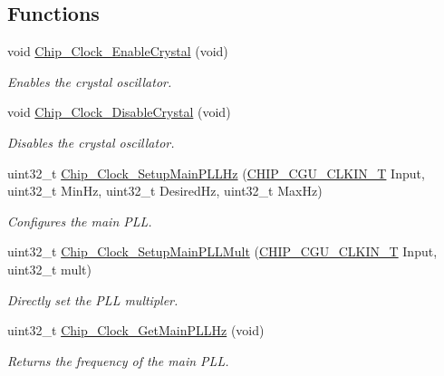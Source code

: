 \subsection*{Functions}
\begin{DoxyCompactItemize}
\item 
void \hyperlink{group___c_l_o_c_k__18_x_x__43_x_x_gaa74040cd24046b7e09cbb2c1cf6e6c0d}{Chip\+\_\+\+Clock\+\_\+\+Enable\+Crystal} (void)
\begin{DoxyCompactList}\small\item\em Enables the crystal oscillator. \end{DoxyCompactList}\item 
void \hyperlink{group___c_l_o_c_k__18_x_x__43_x_x_gadbc79ec252fc8518b284aff51e86adf5}{Chip\+\_\+\+Clock\+\_\+\+Disable\+Crystal} (void)
\begin{DoxyCompactList}\small\item\em Disables the crystal oscillator. \end{DoxyCompactList}\item 
uint32\+\_\+t \hyperlink{group___c_l_o_c_k__18_x_x__43_x_x_ga1667168db76064ac1c2bebd3dfa6db6d}{Chip\+\_\+\+Clock\+\_\+\+Setup\+Main\+P\+L\+L\+Hz} (\hyperlink{group___c_l_o_c_k__18_x_x__43_x_x_ga0975326707efebf2b074283e6c602f18}{C\+H\+I\+P\+\_\+\+C\+G\+U\+\_\+\+C\+L\+K\+I\+N\+\_\+T} Input, uint32\+\_\+t Min\+Hz, uint32\+\_\+t Desired\+Hz, uint32\+\_\+t Max\+Hz)
\begin{DoxyCompactList}\small\item\em Configures the main P\+LL. \end{DoxyCompactList}\item 
uint32\+\_\+t \hyperlink{group___c_l_o_c_k__18_x_x__43_x_x_ga02f88a46ae6e2b942e8c5fd58915634e}{Chip\+\_\+\+Clock\+\_\+\+Setup\+Main\+P\+L\+L\+Mult} (\hyperlink{group___c_l_o_c_k__18_x_x__43_x_x_ga0975326707efebf2b074283e6c602f18}{C\+H\+I\+P\+\_\+\+C\+G\+U\+\_\+\+C\+L\+K\+I\+N\+\_\+T} Input, uint32\+\_\+t mult)
\begin{DoxyCompactList}\small\item\em Directly set the P\+LL multipler. \end{DoxyCompactList}\item 
uint32\+\_\+t \hyperlink{group___c_l_o_c_k__18_x_x__43_x_x_gac52f49ae117b1091809cb24f18481b86}{Chip\+\_\+\+Clock\+\_\+\+Get\+Main\+P\+L\+L\+Hz} (void)
\begin{DoxyCompactList}\small\item\em Returns the frequency of the main P\+LL. \end{DoxyCompactList}\item 

\end{DoxyCompactItemize}
